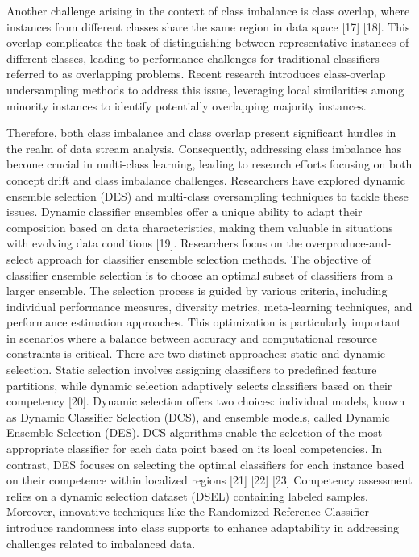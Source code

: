 Another challenge arising in the context of class imbalance is class overlap, where instances from different classes share the same region in data space [17] [18]. This overlap complicates the task of distinguishing between representative instances of different classes, leading to performance challenges for traditional classifiers referred to as overlapping problems. Recent research introduces class-overlap undersampling methods to address this issue, leveraging local similarities among minority instances to identify potentially overlapping majority instances.

Therefore, both class imbalance and class overlap present significant hurdles in the realm of data stream analysis. Consequently, addressing class imbalance has become crucial in multi-class learning, leading to research efforts focusing on both concept drift and class imbalance challenges. Researchers have explored dynamic ensemble selection (DES) and multi-class oversampling techniques to tackle these issues. Dynamic classifier ensembles offer a unique ability to adapt their composition based on data characteristics, making them valuable in situations with evolving data conditions [19]. Researchers focus on the overproduce-and-select approach for classifier ensemble selection methods. The objective of classifier ensemble selection is to choose an optimal subset of classifiers from a larger ensemble. The selection process is guided by various criteria, including individual performance measures, diversity metrics, meta-learning techniques, and performance estimation approaches. This optimization is particularly important in scenarios where a balance between accuracy and computational resource constraints is critical. There are two distinct approaches: static and dynamic selection. Static selection involves assigning classifiers to predefined feature partitions, while dynamic selection adaptively selects classifiers based on their competency [20]. Dynamic selection offers two choices: individual models, known as Dynamic Classifier Selection (DCS), and ensemble models, called Dynamic Ensemble Selection (DES). DCS algorithms enable the selection of the most appropriate classifier for each data point based on its local competencies. In contrast, DES focuses on selecting the optimal classifiers for each instance based on their competence within localized regions [21] [22] [23] Competency assessment relies on a dynamic selection dataset (DSEL) containing labeled samples. Moreover, innovative techniques like the Randomized Reference Classifier introduce randomness into class supports to enhance adaptability in addressing challenges related to imbalanced data.

